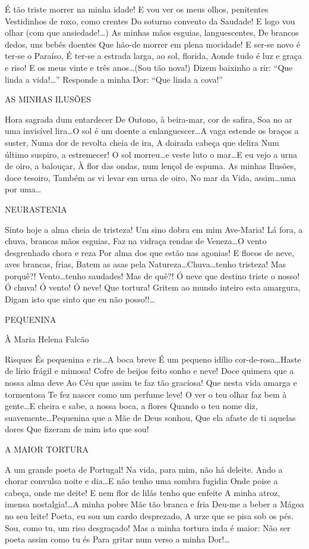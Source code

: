 É tão triste morrer na minha idade! E vou ver os meus olhos, penitentes Vestidinhos de roxo, como crentes Do soturno convento da Saudade! E logo vou olhar (com que ansiedade!\ldots   ) As minhas mãos esguias, languescentes, De brancos dedos, uns bebês doentes Que hão-de morrer em plena mocidade! E ser-se novo é ter-se o Paraíso, É ter-se a estrada larga, ao sol, florida, Aonde tudo é luz e graça e riso! E os meus vinte e três anos\ldots (Sou tão nova!) Dizem baixinho a rir: “Que linda a vida!\ldots   ” Responde a minha Dor: “Que linda a cova!” 

AS MINHAS ILUSÕES

Hora sagrada dum entardecer De Outono, à beira-mar, cor de safira, Soa no ar uma invisível lira\ldots O sol é um doente a enlanguescer\ldots A vaga estende os braços a suster, Numa dor de revolta cheia de ira, A doirada cabeça que delira Num último suspiro, a estremecer! O sol morreu\ldots e veste luto o mar\ldots E eu vejo a urna de oiro, a balouçar, À flor das ondas, num lençol de espuma. As minhas Ilusões, doce tesoiro, Também as vi levar em urna de oiro, No mar da Vida, assim\ldots uma por uma\ldots 

NEURASTENIA

Sinto hoje a alma cheia de tristeza! Um sino dobra em mim Ave-Maria! Lá fora, a chuva, brancas mãos esguias, Faz na vidraça rendas de Veneza\ldots O vento desgrenhado chora e reza Por alma dos que estão nas agonias! E flocos de neve, aves brancas, frias, Batem as asas pela Natureza\ldots Chuva\ldots tenho tristeza! Mas porquê?! Vento\ldots tenho saudades! Mas de quê?! Ó neve que destino triste o nosso! Ó chuva! Ó vento! Ó neve! Que tortura! Gritem ao mundo inteiro esta amargura, Digam isto que sinto que eu não posso!!\ldots 

PEQUENINA

À Maria Helena Falcão

Risques És pequenina e ris\ldots A boca breve É um pequeno idílio cor-de-rosa\ldots Haste de lírio frágil e mimosa! Cofre de beijos feito sonho e neve! Doce quimera que a nossa alma deve Ao Céu que assim te faz tão graciosa! Que nesta vida amarga e tormentosa Te fez nascer como um perfume leve! O ver o teu olhar faz bem à gente\ldots E cheira e sabe, a nossa boca, a flores Quando o teu nome diz, suavemente\ldots Pequenina que a Mãe de Deus sonhou, Que ela afaste de ti aquelas dores Que fizeram de mim isto que sou! 

A MAIOR TORTURA

A um grande poeta de Portugal! Na vida, para mim, não há deleite. Ando a chorar convulsa noite e dia\ldots E não tenho uma sombra fugidia Onde poise a cabeça, onde me deite! E nem flor de lilás tenho que enfeite A minha atroz, imensa nostalgia!\ldots A minha pobre Mãe tão branca e fria Deu-me a beber a Mágoa no seu leite! Poeta, eu sou um cardo desprezado, A urze que se pisa sob os pés. Sou, como tu, um riso desgraçado! Mas a minha tortura inda é maior: Não ser poeta assim como tu és Para gritar num verso a minha Dor!\ldots 

